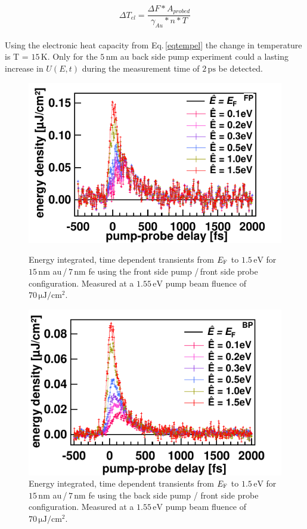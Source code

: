 \documentclass[a4paper,12pt,twoside]{article}
\begin{document}
\begin{equation}
    \label{eqtempel}
    \Delta T_{el} = \frac{ \Delta F * A_{probed} }{ \gamma_{Au} * n * T }
\end{equation}
\\
Using the electronic heat capacity from Eq.\,\ref{eqtempel} the change in temperature is T = $15\,\mathrm{K}$. Only for the $5\,\mathrm{nm}$ \gls{au} back side pump experiment could a lasting increase in $U(E,t)$ during the measurement time of $2\,\mathrm{ps}$ be detected.
	\begin{figure}[H]
		\begin{minipage}[t]{.45\linewidth}
			\includegraphics[width=\linewidth]{figures/15nmFPcorr.pdf}
			\caption{Energy integrated, time dependent transients from $E_{\rm{F}}$ to $1.5\,\mathrm{{eV}}$ for $15\,\mathrm{{nm}}$ \gls{au}\,/\,$7\,\mathrm{{nm}}$ \gls{fe} using the front side pump /\,front side probe configuration. Measured at a $1.55\,\mathrm{eV}$ pump beam fluence of $70\,\mathrm{\mu J/cm^2}$.}
	    		\label{15nmFPnoNorm}
		\end{minipage}
	\hspace{.075\linewidth}
		\begin{minipage}[t]{.45\linewidth}
			\includegraphics[width=\linewidth]{figures/15nmBPcorr.pdf}
			\caption{Energy integrated, time dependent transients from $E_{\rm{F}}$ to $1.5\,\mathrm{{eV}}$ for $15\,\mathrm{{nm}}$ \gls{au}\,/\,$7\,\mathrm{{nm}}$ \gls{fe} using the back side pump / front side probe configuration. Measured at a $1.55\,\mathrm{eV}$ pump beam fluence of $70\,\mathrm{\mu J/cm^2}$.}
    			\label{15nmBPnoNorm}
		\end{minipage}
	\end{figure}
\end{document}
